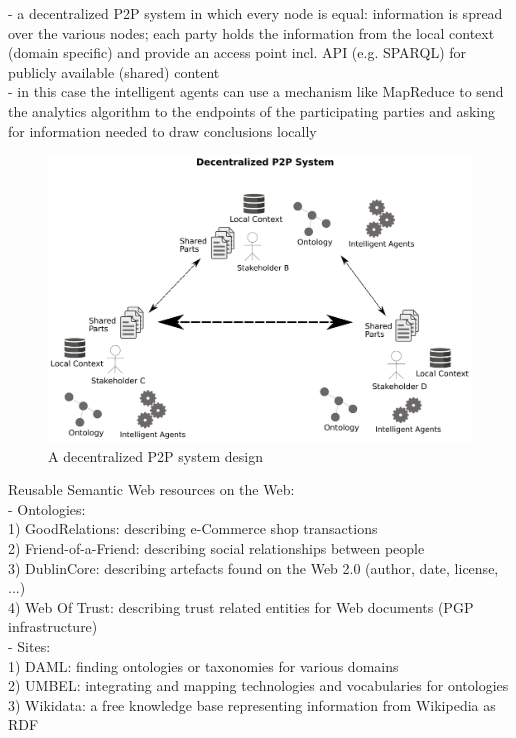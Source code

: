 - a decentralized P2P system in which every node is equal: information is spread over the various nodes; each party holds the information
from the local context (domain specific) and provide an access point incl. API (e.g. SPARQL) for publicly available (shared) content \\
- in this case the intelligent agents can use a mechanism like MapReduce to send the analytics algorithm to the endpoints of the participating parties
and asking for information needed to draw conclusions locally \\

\begin{figure}[H]
	\centering
		\includegraphics[width=0.8\columnwidth]{images/system_P2P_decentralized.pdf}
	\caption{A decentralized P2P system design}
\label{fig:images_system_P2P_decentralized}
\end{figure}

Reusable Semantic Web resources on the Web: \\
- Ontologies: \\
	1) GoodRelations: describing e-Commerce shop transactions \\
	2) Friend-of-a-Friend: describing social relationships between people \\
	3) DublinCore: describing artefacts found on the Web 2.0 (author, date, license, ...) \\
	4) Web Of Trust: describing trust related entities for Web documents (PGP infrastructure) \\
- Sites: \\
  1) DAML: finding ontologies or taxonomies for various domains \\
	2) UMBEL: integrating and mapping technologies and vocabularies for ontologies \\
	3) Wikidata: a free knowledge base representing information from Wikipedia as RDF \\
\\
